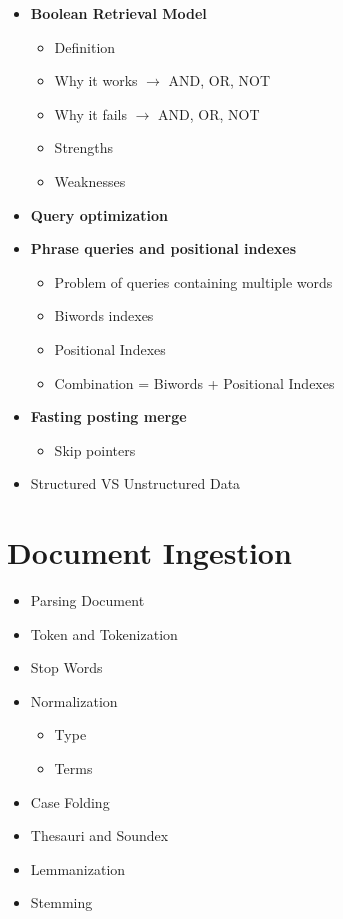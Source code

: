 \begin{itemize}
    \item \textbf{Boolean Retrieval Model}
    \begin{itemize}
        \item Definition
        \item Why it works \(\rightarrow\) AND, OR, NOT
        \item Why it fails \(\rightarrow\) AND, OR, NOT
        \item Strengths
        \item Weaknesses
    \end{itemize}
    \item \textbf{Query optimization}
    \item \textbf{Phrase queries and positional indexes}
    \begin{itemize}
        \item Problem of queries containing multiple words
        \item Biwords indexes
        \item Positional Indexes
        \item Combination = Biwords + Positional Indexes 
    \end{itemize}
    \item \textbf{Fasting posting merge}
    \begin{itemize}
        \item Skip pointers
    \end{itemize}
    \item Structured VS Unstructured Data
\end{itemize}

\chapter{Document Ingestion}
\begin{itemize}
    \item Parsing Document
    \item Token and Tokenization
    \item Stop Words
    \item Normalization
    \begin{itemize}
        \item Type
        \item Terms
    \end{itemize}
    \item Case Folding
    \item Thesauri and Soundex
    \item Lemmanization
    \item Stemming
\end{itemize}

